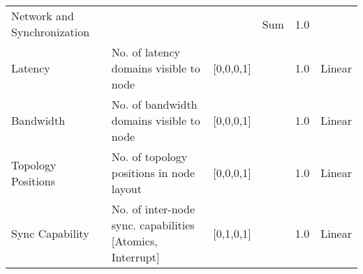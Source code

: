 \begin{tabularx}{\textwidth}{@{}lXcccc@{}}
\hspace{3mm} Network and Synchronization &  &  & Sum & 1.0 &  \\ 

\hspace{6mm} Latency & No. of latency domains visible to node & [0,0,0,1] &  & 1.0 & Linear \\ 

\hspace{6mm} Bandwidth & No. of bandwidth domains visible to node & [0,0,0,1] &  & 1.0 & Linear \\ 

\hspace{6mm} Topology Positions & No. of topology positions in node layout & [0,0,0,1] &  & 1.0 & Linear \\ 

\hspace{6mm} Sync Capability & No. of inter-node sync. capabilities [Atomics, Interrupt] & [0,1,0,1] &  & 1.0 & Linear \\ 


\bottomrule
\end{tabularx}
